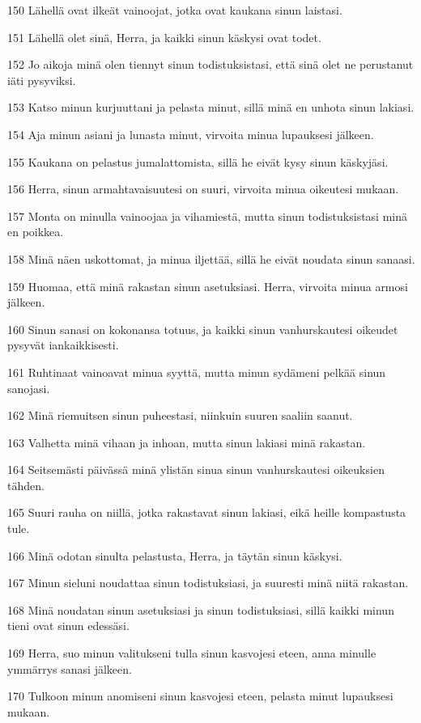 \par 150 Lähellä ovat ilkeät vainoojat, jotka ovat kaukana sinun laistasi.
\par 151 Lähellä olet sinä, Herra, ja kaikki sinun käskysi ovat todet.
\par 152 Jo aikoja minä olen tiennyt sinun todistuksistasi, että sinä olet ne perustanut iäti pysyviksi.
\par 153 Katso minun kurjuuttani ja pelasta minut, sillä minä en unhota sinun lakiasi.
\par 154 Aja minun asiani ja lunasta minut, virvoita minua lupauksesi jälkeen.
\par 155 Kaukana on pelastus jumalattomista, sillä he eivät kysy sinun käskyjäsi.
\par 156 Herra, sinun armahtavaisuutesi on suuri, virvoita minua oikeutesi mukaan.
\par 157 Monta on minulla vainoojaa ja vihamiestä, mutta sinun todistuksistasi minä en poikkea.
\par 158 Minä näen uskottomat, ja minua iljettää, sillä he eivät noudata sinun sanaasi.
\par 159 Huomaa, että minä rakastan sinun asetuksiasi. Herra, virvoita minua armosi jälkeen.
\par 160 Sinun sanasi on kokonansa totuus, ja kaikki sinun vanhurskautesi oikeudet pysyvät iankaikkisesti.
\par 161 Ruhtinaat vainoavat minua syyttä, mutta minun sydämeni pelkää sinun sanojasi.
\par 162 Minä riemuitsen sinun puheestasi, niinkuin suuren saaliin saanut.
\par 163 Valhetta minä vihaan ja inhoan, mutta sinun lakiasi minä rakastan.
\par 164 Seitsemästi päivässä minä ylistän sinua sinun vanhurskautesi oikeuksien tähden.
\par 165 Suuri rauha on niillä, jotka rakastavat sinun lakiasi, eikä heille kompastusta tule.
\par 166 Minä odotan sinulta pelastusta, Herra, ja täytän sinun käskysi.
\par 167 Minun sieluni noudattaa sinun todistuksiasi, ja suuresti minä niitä rakastan.
\par 168 Minä noudatan sinun asetuksiasi ja sinun todistuksiasi, sillä kaikki minun tieni ovat sinun edessäsi.
\par 169 Herra, suo minun valitukseni tulla sinun kasvojesi eteen, anna minulle ymmärrys sanasi jälkeen.
\par 170 Tulkoon minun anomiseni sinun kasvojesi eteen, pelasta minut lupauksesi mukaan.
